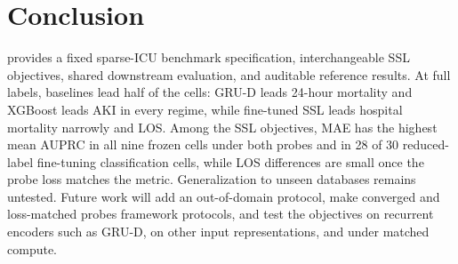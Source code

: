 \section{Conclusion}
\label{sec:conclusion}

\SLICES{} provides a fixed sparse-ICU benchmark specification, interchangeable SSL objectives, shared downstream evaluation, and auditable reference results. At full labels, baselines lead half of the cells: GRU-D leads 24-hour mortality and XGBoost leads AKI in every regime, while fine-tuned SSL leads hospital mortality narrowly and LOS. Among the SSL objectives, MAE has the highest mean AUPRC in all nine frozen cells under both probes and in 28 of 30 reduced-label fine-tuning classification cells, while LOS differences are small once the probe loss matches the metric. Generalization to unseen databases remains untested. Future work will add an out-of-domain protocol, make converged and loss-matched probes framework protocols, and test the objectives on recurrent encoders such as GRU-D, on other input representations, and under matched compute.
